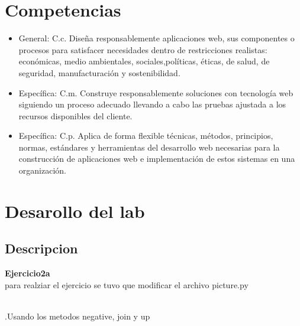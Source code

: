 \documentclass{article}
\begin{document}
\maketitle


\section{Competencias}




    \begin{itemize}
        \item General: C.c. Diseña responsablemente aplicaciones web, sus componentes o procesos para satisfacer necesidades dentro de restricciones realistas: económicas, medio ambientales, sociales,políticas, éticas, de salud, de seguridad, manufacturación y sostenibilidad.
        \item Específica: C.m. Construye responsablemente soluciones con tecnología web siguiendo un proceso adecuado llevando a cabo las pruebas ajustada a los recursos disponibles del cliente.
        \item Específica: C.p. Aplica de forma flexible técnicas, métodos, principios, normas, estándares y herramientas del desarrollo web necesarias para la construcción de aplicaciones web e implementación de estos sistemas en una organización.
        
    \end{itemize}


\section{Desarollo del lab}
\subsection{Descripcion}
\textbf{Ejercicio2a }
\\para realziar el ejercicio se tuvo que modificar el archivo picture.py

\\.Usando los metodos negative, join y up
\end{document}

